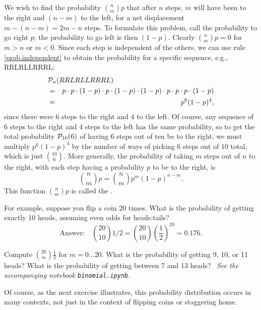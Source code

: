 We wish to find the probability $\binom{n}{m}{p}$ that after $n$ steps, $m$ will have been to the right and $(n-m)$ to the left, for a net displacement $m-(n-m) = 2m-n$ steps.
To formulate this problem, call the probability to go right $p$; the probability to go left is then $(1-p)$.
Clearly $\binom{n}{m}{p} = 0$ for $m>n$ or $m<0$. Since each step is independent of the others, we can use rule \ref{prob.independent} to obtain the probability for a specific sequence, e.g., RRLRLLRRRL:
\begin{eqnarray}
	\lefteqn{\prob_{n}(RRLRLLRRRL) } \nonumber\\
	&=& p\cdot p\cdot(1-p)\cdot p\cdot(1-p)\cdot(1-p)\cdot p\cdot p\cdot p\cdot(1-p) \nonumber\\
	&=& p^{6}(1-p)^{4}
\label{e.one-sequence},
\end{eqnarray}
since there were 6 steps to the right and 4 to the left. Of course, any sequence of 6 steps to the right and 4 steps to the left has the same probability, so to get the total probability $\mathcal{P}_{10}(6)$ of having 6 steps out of ten be to the right, we must multiply $p^{6}(1-p)^{4}$ by the number of ways of picking $6$ steps out of $10$ total, which is just $10\choose6$.  More generally, the probability of taking $m$ steps out of $n$ to the right, with each step having a probability $p$ to be to the right, is
\begin{equation}\label{e.binomial}
	\binom{n}{m}{p} = {n\choose m} p^{m}(1-p)^{n-m}.
\end{equation}
This function $\binom{n}{m}{p}$ is called the .

For example, suppose you flip a coin 20 times.  What is the probability of getting exactly 10 heads, assuming even odds for heads:tails?
\[
	\textrm{Answer:}\quad\binom{20}{10}{1/2} = {20\choose10} \left(\frac{1}{2}\right)^{20} = 0.176.
\]
\begin{exercisebox}
\label{e.prob-distribution}
Compute $\binom{20}{m}{\frac{1}{2}}$ for $m = 0\ldots20$.  What is the probability of getting 9, 10, or 11 heads?  What is the probability of getting between 7 and 13 heads? \notebook\ \emph{See the accompanying notebook \texttt{binomial.ipynb}.}
\end{exercisebox}

Of course, as the next exercise illustrates, this probability distribution occurs in many contexts, not just in the context of flipping coins or staggering home.

